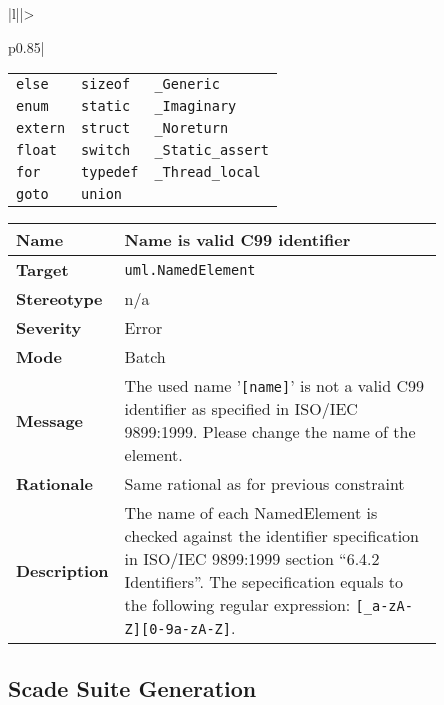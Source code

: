 \documentclass{template/openetcs_article}
\begin{document}
\begin{longtable}{|l||>{\raggedright}p{0.85\linewidth}|}
\begin{tabular}{l l l}
                           \texttt{else}     & \texttt{sizeof}   & \texttt{\_Generic}       \\
                           \texttt{enum}     & \texttt{static}   & \texttt{\_Imaginary}     \\
                           \texttt{extern}   & \texttt{struct}   & \texttt{\_Noreturn}      \\
                           \texttt{float}    & \texttt{switch}   & \texttt{\_Static\_assert} \\
                           \texttt{for}      & \texttt{typedef}  & \texttt{\_Thread\_local}  \\
                           \texttt{goto}     & \texttt{union} \\
                         \end{tabular}\tabularnewline \hline
\end{longtable}

\begin{longtable}{|l||>{\raggedright}p{0.85\linewidth}|}
  \hline
  \textbf{Name}        &  Name is valid C99 identifier \tabularnewline \hline
  \textbf{Target}      &  \texttt{uml.NamedElement} \tabularnewline \hline
  \textbf{Stereotype}  &  n/a \tabularnewline \hline
  \textbf{Severity}    &  Error \tabularnewline \hline
  \textbf{Mode}        &  Batch \tabularnewline \hline
  \textbf{Message}     &  The used name '\texttt{[name]}' is not a valid C99 identifier as specified in 
                          ISO/IEC 9899:1999. Please change the name of the element. \tabularnewline \hline
  \textbf{Rationale}   &  Same rational as for previous constraint \tabularnewline \hline
  \textbf{Description} &  The name of each NamedElement is checked against the identifier specification
                          in ISO/IEC 9899:1999 section ``6.4.2 Identifiers''. The sepecification equals to the
                          following regular expression: \texttt{[\_a-zA-Z][0-9a-zA-Z\*]}. \tabularnewline \hline
\end{longtable}

\subsection{Scade Suite Generation}
\end{document}

